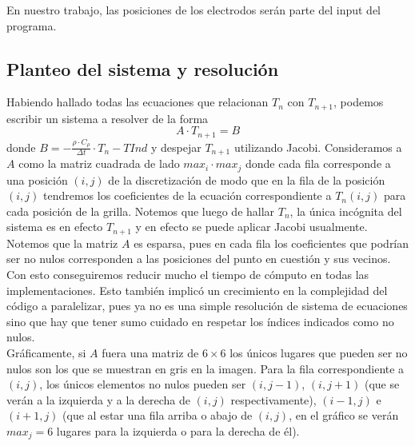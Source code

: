 \documentclass[a4paper]{article}
\begin{document}
En nuestro trabajo, las posiciones de los electrodos serán parte del input del programa.

\subsection{Planteo del sistema y resolución}

Habiendo hallado todas las ecuaciones que relacionan $T_n$ con $T_{n+1}$, 
podemos escribir un sistema a resolver de la forma $$A \cdot T_{n+1} = B$$ donde 
$B = -\frac{\rho \cdot C_\rho}{\Delta t} \cdot T_n - TInd$ y 
despejar $T_{n+1}$ utilizando Jacobi. Consideramos a $A$ como la matriz 
cuadrada de lado $max_i \cdot max_j$ donde cada fila corresponde a 
una posición $(i, j)$ de la discretización de modo que en la fila de la 
posición $(i, j)$ tendremos los coeficientes de la ecuación correspondiente 
a $T_n(i,j)$ para cada posición de la grilla. Notemos que luego de hallar $T_n$, 
la única incógnita del sistema es en efecto $T_{n+1}$ y en efecto se puede 
aplicar Jacobi usualmente.\\

Notemos que la matriz $A$ es esparsa, pues en cada fila los coeficientes 
que podrían ser no nulos corresponden a las posiciones del punto en 
cuestión y sus vecinos. Con esto conseguiremos reducir mucho el tiempo 
de cómputo en todas las implementaciones. Esto también implicó un crecimiento
en la complejidad del código a paralelizar, pues ya no es una simple resolución
de sistema de ecuaciones sino que hay que tener sumo cuidado en respetar
los índices indicados como no nulos. \\

Gráficamente, si $A$ fuera una matriz de $6 \times 6$ los únicos lugares que pueden
ser no nulos son los que se muestran en gris en la imagen. Para la fila 
correspondiente a $(i,j)$, los únicos elementos no nulos pueden ser $(i, j-1)$, 
$(i,j+1)$ (que se verán a la izquierda y a la derecha de $(i,j)$ respectivamente), 
$(i-1, j)$ e $(i+1,j)$ (que al estar una fila arriba o abajo de $(i,j)$, 
en el gráfico se verán $max_j = 6$ lugares para la izquierda o para la derecha de él). 
\end{document}
